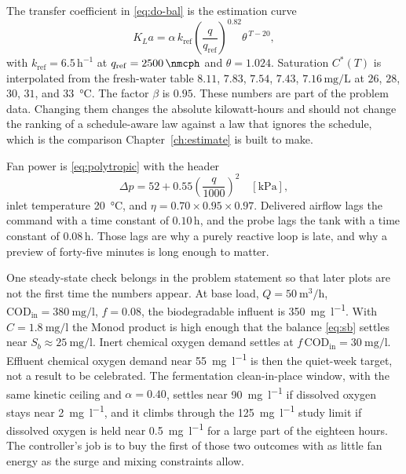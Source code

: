 The transfer coefficient in \eqref{eq:do-bal} is the estimation curve
\begin{equation}
\label{eq:kla-est}
K_La
=
\alpha\,
k_{\mathrm{ref}}
\left(\frac{q}{q_{\mathrm{ref}}}\right)^{0.82}
\theta^{\,T-20},
\end{equation}
with $k_{\mathrm{ref}}=6.5\,\mathrm{h^{-1}}$ at $q_{\mathrm{ref}}=\SI{2500}{\nmcph}$ and $\theta=1.024$. Saturation $C^{*}(T)$ is interpolated from the fresh-water table $8.11$, $7.83$, $7.54$, $7.43$, $7.16\,\mathrm{mg/L}$ at $26$, $28$, $30$, $31$, and \SI{33}{\celsius}. The factor $\beta$ is $0.95$. These numbers are part of the problem data. Changing them changes the absolute kilowatt-hours and should not change the ranking of a schedule-aware law against a law that ignores the schedule, which is the comparison Chapter~\ref{ch:estimate} is built to make.

Fan power is \eqref{eq:polytropic} with the header
\begin{equation}
\label{eq:dp-num}
\Delta p
=
52
+
0.55\left(\frac{q}{1000}\right)^{2}
\quad[\mathrm{kPa}],
\end{equation}
inlet temperature \SI{20}{\celsius}, and $\eta=0.70\times 0.95\times 0.97$. Delivered airflow lags the command with a time constant of $0.10\,\mathrm{h}$, and the probe lags the tank with a time constant of $0.08\,\mathrm{h}$. Those lags are why a purely reactive loop is late, and why a preview of forty-five minutes is long enough to matter.

One steady-state check belongs in the problem statement so that later plots are not the first time the numbers appear. At base load, $Q=\SI{50}{\cubic\metre\per\hour}$, $\mathrm{COD}_{\mathrm{in}}=\SI{380}{\milli\gram\per\litre}$, $f=0.08$, the biodegradable influent is \SI{350}{\milli\gram\per\litre}. With $C=\SI{1.8}{\milli\gram\per\litre}$ the Monod product is high enough that the balance \eqref{eq:sb} settles near $S_{b}\approx\SI{25}{\milli\gram\per\litre}$. Inert chemical oxygen demand settles at $f\,\mathrm{COD}_{\mathrm{in}}=\SI{30}{\milli\gram\per\litre}$. Effluent chemical oxygen demand near \SI{55}{\milli\gram\per\litre} is then the quiet-week target, not a result to be celebrated. The fermentation clean-in-place window, with the same kinetic ceiling and $\alpha=0.40$, settles near \SI{90}{\milli\gram\per\litre} if dissolved oxygen stays near \SI{2}{\milli\gram\per\litre}, and it climbs through the \SI{125}{\milli\gram\per\litre} study limit if dissolved oxygen is held near \SI{0.5}{\milli\gram\per\litre} for a large part of the eighteen hours. The controller's job is to buy the first of those two outcomes with as little fan energy as the surge and mixing constraints allow.

